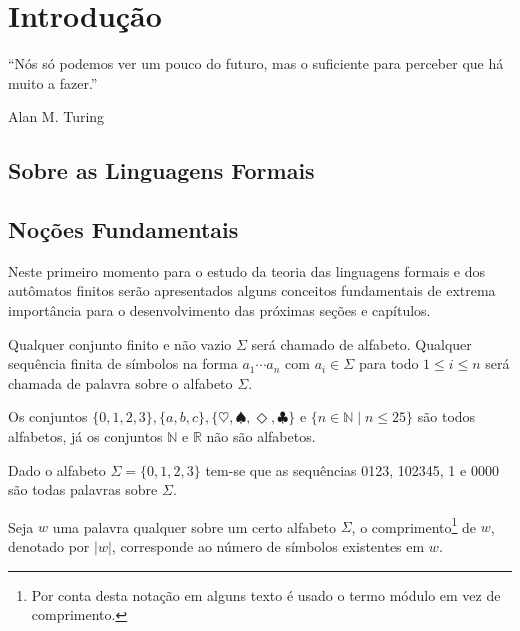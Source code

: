 \chapter{Introdução}\label{cap:LinguagemFormais}


\epigraph{``Nós só podemos ver um pouco do futuro, mas o suficiente para perceber que há muito a fazer.''}{Alan M. Turing}

\section{Sobre as Linguagens Formais}\label{sec:Linguagens}

\section{Noções Fundamentais}\label{sec:Nocoesbasicas}

Neste primeiro momento para o estudo da teoria das linguagens formais e dos autômatos finitos serão apresentados alguns conceitos fundamentais de extrema importância para o desenvolvimento das próximas seções e capítulos.

\begin{definition}\label{def:AlfabetoPalavra}
	Qualquer conjunto finito e não vazio $\Sigma$ será chamado de alfabeto. Qualquer sequência finita de símbolos na forma $a_1\cdots a_n$ com $a_i \in \Sigma$ para todo $1 \leq i \leq n$ será chamada de palavra sobre o alfabeto $\Sigma$.
\end{definition}

\begin{example}
	Os conjuntos $\{0, 1, 2, 3\}, \{a, b, c\}, \{\heartsuit,\spadesuit, \Diamond, \clubsuit\}$ e $\{n \in \mathbb{N} \mid n \leq 25\}$ são todos alfabetos, já os conjuntos $\mathbb{N}$ e $\mathbb{R}$ não são alfabetos.
\end{example}

\begin{example}
	Dado o alfabeto $\Sigma = \{0, 1, 2, 3\}$ tem-se que as sequências 0123, 102345, 1 e 0000 são todas palavras sobre $\Sigma$.
\end{example}

\begin{definition}\label{def:ComprimentoPalavra}
	Seja $w$ uma palavra qualquer sobre um certo alfabeto $\Sigma$, o comprimento\footnote{Por conta desta notação em alguns texto é usado o termo módulo em vez de comprimento.} de $w$, denotado por $|w|$, corresponde ao número de símbolos existentes em $w$.
\end{definition}

